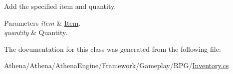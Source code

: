 Add the specified item and quantity. 


\begin{DoxyParams}{Parameters}
{\em item} & \hyperlink{class_athena_engine_1_1_framework_1_1_gameplay_1_1_r_p_g_1_1_item}{Item}. \\
\hline
{\em quantity} & Quantity. \\
\hline
\end{DoxyParams}


The documentation for this class was generated from the following file\-:\begin{DoxyCompactItemize}
\item 
Athena/\-Athena/\-Athena\-Engine/\-Framework/\-Gameplay/\-R\-P\-G/\hyperlink{_inventory_8cs}{Inventory.\-cs}\end{DoxyCompactItemize}
